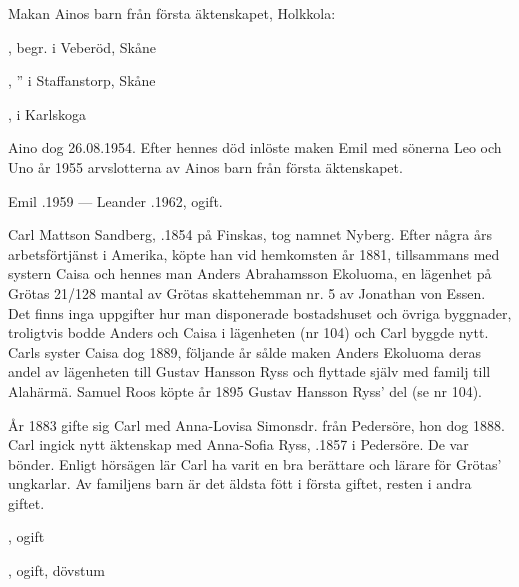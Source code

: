 Makan Ainos barn från första äktenskapet, Holkkola:
\begin{jhchildren}
  \item {}, begr. i Veberöd, Skåne
  \item {}, '' i Staffanstorp, Skåne
  \item {}, i Karlskoga
\end{jhchildren}

Aino dog 26.08.1954. Efter hennes död inlöste maken Emil med sönerna Leo och Uno år 1955 arvslotterna av Ainos barn från  första äktenskapet.

Emil .1959  ---  Leander .1962, ogift.


Carl Mattson Sandberg, .1854 på Finskas, tog namnet Nyberg. Efter några års arbetsförtjänst i Amerika, köpte han vid hemkomsten år 1881, tillsammans med systern Caisa och hennes man Anders Abrahamsson Ekoluoma, en lägenhet på Grötas 21/128 mantal av Grötas skattehemman nr. 5 av Jonathan von Essen. Det finns inga uppgifter hur man disponerade bostadshuset och övriga byggnader, troligtvis bodde Anders och Caisa i lägenheten (nr 104) och Carl byggde nytt. Carls syster Caisa dog 1889, följande år sålde maken Anders Ekoluoma deras andel av lägenheten till Gustav Hansson Ryss och flyttade själv med familj till Alahärmä. Samuel Roos köpte år 1895 Gustav Hansson Ryss' del (se nr 104).

År 1883 gifte sig Carl med  Anna-Lovisa Simonsdr. från Pedersöre, hon dog 1888. Carl ingick nytt äktenskap med Anna-Sofia Ryss, .1857 i Pedersöre. De var bönder. Enligt hörsägen lär Carl ha varit en bra berättare och lärare för Grötas' ungkarlar. Av familjens barn är det äldsta fött i första giftet, resten i andra giftet.
\begin{jhchildren}
  \item {}, ogift
  \item {}
  \item {}
  \item {}, ogift, dövstum
\end{jhchildren}

